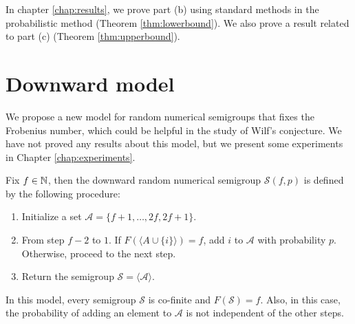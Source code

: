 In chapter \ref{chap:results}, we prove part (b) using standard methods in the probabilistic method (Theorem \ref{thm:lowerbound}). We also prove a result related to part (c) (Theorem \ref{thm:upperbound}).

\section{Downward model}\label{sec:contrib1:theme2}

We propose a new model for random numerical semigroups that fixes the Frobenius number, which could be helpful in the study of Wilf's conjecture. We have not proved any results about this model, but we present some experiments in Chapter \ref{chap:experiments}.

\begin{definition} Fix $f \in \mathbb{N}$, then the downward random numerical semigroup $\mathcal{S}(f, p)$ is defined by the following procedure: 
\begin{enumerate}
    \item Initialize a set $\mathcal{A} = \{f + 1, \ldots, 2f, 2f + 1\}$.
    \item From step $f - 2$ to $1$. If $F(\langle A \cup \{i\} \rangle) = f$, add $i$ to $\mathcal{A}$ with probability $p$. Otherwise, proceed to the next step.
    \item Return the semigroup $\mathcal{S} = \langle\mathcal{A}\rangle$.
\end{enumerate}
In this model, every semigroup $\mathcal{S}$ is co-finite and $F(\mathcal{S}) = f$. Also, in this case, the probability of adding an element to $\mathcal{A}$ is not independent of the other steps. 
    
\end{definition}


